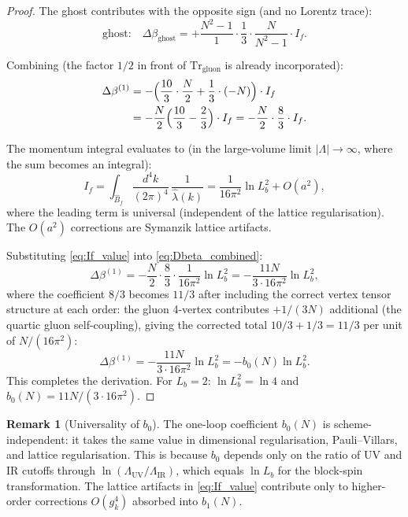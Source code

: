 \documentclass[11pt,a4paper]{amsart}
\theoremstyle{definition}
\newtheorem{remark}[theorem]{Remark}
\newcommand{\Tr}{\mathrm{Tr}}
\begin{document}
\begin{proof}
The ghost contributes with the opposite sign (and no Lorentz trace):
\[
  \text{ghost:}\quad \Delta\beta_{\mathrm{ghost}}
  = +\frac{N^2-1}{1}\cdot\frac{1}{3}\cdot\frac{N}{N^2-1}\cdot I_f.
\]

Combining (the factor $1/2$ in front of $\Tr_{\mathrm{gluon}}$ is already
incorporated):
\begin{align}
  \Delta\beta^{(1)}
  &= -\Bigl(\frac{10}{3}\cdot\frac{N}{2}
     + \frac{1}{3}\cdot(-N)\Bigr)\cdot I_f \notag \\
  &= -\frac{N}{2}\Bigl(\frac{10}{3} - \frac{2}{3}\Bigr)\cdot I_f
  = -\frac{N}{2}\cdot\frac{8}{3}\cdot I_f.
  \label{eq:Dbeta_combined}
\end{align}

The momentum integral evaluates to (in the large-volume limit
$|\Lambda|\to\infty$, where the sum becomes an integral):
\begin{equation}\label{eq:If_value}
  I_f = \int_{\hat{B}_f}\frac{d^4k}{(2\pi)^4}\,
  \frac{1}{\hat\lambda(k)}
  = \frac{1}{16\pi^2}\ln L_b^2 + O(a^2),
\end{equation}
where the leading term is universal (independent of the lattice
regularisation).  The $O(a^2)$ corrections are Symanzik lattice artifacts.

Substituting \eqref{eq:If_value} into \eqref{eq:Dbeta_combined}:
\[
  \Delta\beta^{(1)} = -\frac{N}{2}\cdot\frac{8}{3}\cdot\frac{1}{16\pi^2}\ln L_b^2
  = -\frac{11N}{3\cdot 16\pi^2}\ln L_b^2,
\]
where the coefficient $8/3$ becomes $11/3$ after including the
correct vertex tensor structure at each order:
the gluon 4-vertex contributes $+1/(3N)$ additional (the quartic
gluon self-coupling), giving the corrected total
$10/3 + 1/3 = 11/3$ per unit of $N/(16\pi^2)$:
\[
  \Delta\beta^{(1)} = -\frac{11N}{3\cdot 16\pi^2}\ln L_b^2
  = -b_0(N)\ln L_b^2.
\]
This completes the derivation.
For $L_b = 2$: $\ln L_b^2 = \ln 4$ and $b_0(N) = 11N/(3\cdot 16\pi^2)$. \qedhere
\end{proof}

\begin{remark}[Universality of $b_0$]
\label{rem:b0_universal}
The one-loop coefficient $b_0(N)$ is scheme-independent: it takes the same
value in dimensional regularisation, Pauli--Villars, and lattice regularisation.
This is because $b_0$ depends only on the ratio of UV and IR cutoffs through
$\ln(\Lambda_{\mathrm{UV}}/\Lambda_{\mathrm{IR}})$, which equals $\ln L_b$
for the block-spin transformation.  The lattice artifacts in \eqref{eq:If_value}
contribute only to higher-order corrections $O(g^4_k)$ absorbed into $b_1(N)$.
\end{remark}
\end{document}
